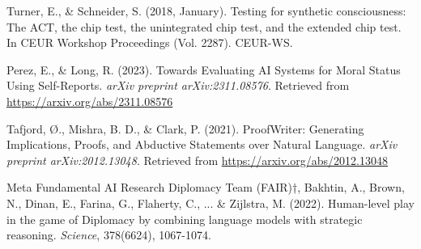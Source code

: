\documentclass{article}
\begin{document}
\begin{thebibliography}{99}

Turner, E., \& Schneider, S. (2018, January). Testing for synthetic consciousness: The ACT, the chip test, the unintegrated chip test, and the extended chip test. In CEUR Workshop Proceedings (Vol. 2287). CEUR-WS. 

Perez, E., \& Long, R. (2023). Towards Evaluating AI Systems for Moral Status Using Self-Reports. \textit{arXiv preprint arXiv:2311.08576}. Retrieved from \url{https://arxiv.org/abs/2311.08576}

Tafjord, Ø., Mishra, B. D., \& Clark, P. (2021). ProofWriter: Generating Implications, Proofs, and Abductive Statements over Natural Language. \textit{arXiv preprint arXiv:2012.13048}. Retrieved from \url{https://arxiv.org/abs/2012.13048}

Meta Fundamental AI Research Diplomacy Team (FAIR)†, Bakhtin, A., Brown, N., Dinan, E., Farina, G., Flaherty, C., ... \& Zijlstra, M. (2022). Human-level play in the game of Diplomacy by combining language models with strategic reasoning. \textit{Science}, 378(6624), 1067-1074.

\end{thebibliography}
\end{document}
